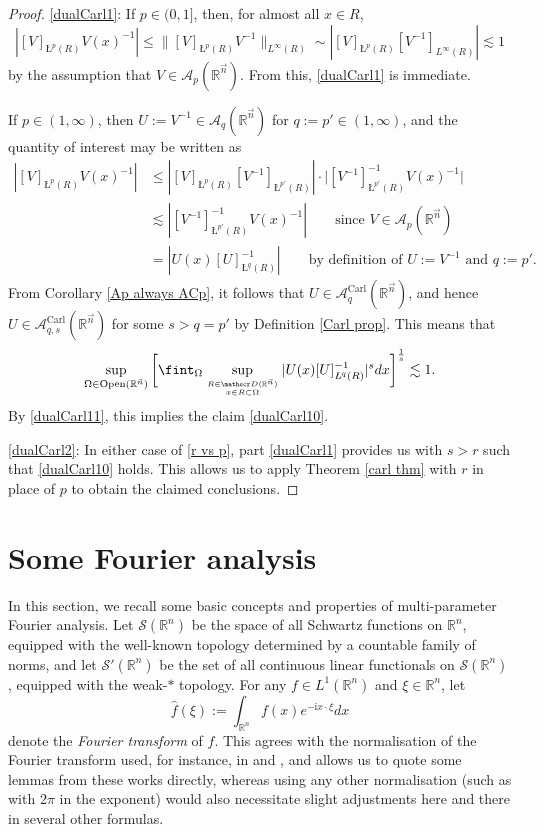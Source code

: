 \documentclass[11pt, reqno]{amsart}
\theoremstyle{definition}
\theoremstyle{remark}
\numberwithin{equation}{section}
\newcommand{\A}{\mathscr A}
\newcommand{\D}{\mathscr D}
\newcommand{\R}{\mathbb R}
\newcommand{\Sc}{\mathscr S}
\newcommand{\vn}{\vec n}
\newcommand{\aveL}{\textit{\L}}
\newcommand{\abs}[1]{|#1|}
\newcommand{\Babs}[1]{\Big|#1\Big|}
\newcommand{\Norm}[2]{\|#1\|_{#2}}
\newcommand{\Carl}{\mathrm{Carl}}
\newcommand{\Open}{\mathrm{Open}}
\newcommand{\AC}{\A^{\Carl}}
\begin{document}
\begin{proof}
\eqref{dualCarl1}:
If $p\in(0,1]$, then, for almost all $x\in R$,
\begin{equation*}
\abs{[V]_{\aveL^p(R)}V(x)^{-1}}
\leq \Norm{[V]_{\aveL^p(R)}V^{-1}}{L^\infty(R)}
\sim \abs{[V]_{\aveL^p(R)}[V^{-1}]_{L^\infty(R)}}\lesssim 1
\end{equation*}
by the assumption that $V\in\A_p(\R^{\vec n})$. From this, \eqref{dualCarl1} is immediate.

If $p\in(1,\infty)$, then $U:=V^{-1}\in\A_q(\R^{\vec n})$ for $q:=p'\in(1,\infty)$, and the quantity of interest may be written as
\begin{equation}\label{dualCarl11}
\begin{split}
\abs{[V]_{\aveL^p(R)}V(x)^{-1}}
 &\leq\abs{[V]_{\aveL^p(R)}[V^{-1}]_{\aveL^{p'}(R)}}\cdot
 \Babs{[V^{-1}]_{\aveL^{p'}(R)}^{-1}V(x)^{-1}} \\
 &\lesssim\abs{[V^{-1}]_{\aveL^{p'}(R)}^{-1}V(x)^{-1}}\qquad\text{since }V\in\A_p(\R^{\vn}) \\
 &=\abs{U(x)[U]_{\aveL^q(R)}^{-1}}\qquad\text{by definition of $U:=V^{-1}$ and $q:=p'$}.
\end{split}
\end{equation}
From Corollary \ref{Ap always ACp}, it follows that $U\in\AC_q(\R^{\vn})$, and hence $U\in\AC_{q,s}(\R^{\vn})$ for some $s>q=p'$ by Definition \ref{Carl prop}. This means that
\begin{equation*}
\sup_{\Omega\in\Open(\R^{\vn})}
\bigg[\fint_\Omega \sup_{\genfrac{}{}{0pt}{}{R\in\D(\R^{\vn})}{x\in R\subset\Omega}}
\abs{U(x)[U]_{\aveL^{q}(R)}^{-1} }^s dx \bigg]^{\frac1s}
\lesssim 1.
\end{equation*}
By \eqref{dualCarl11}, this implies the claim \eqref{dualCarl10}.

\eqref{dualCarl2}: In either case of \eqref{r vs p}, part \eqref{dualCarl1} provides us with $s>r$ such that \eqref{dualCarl10} holds. This allows us to apply Theorem \ref{carl thm} with $r$ in place of $p$ to obtain the claimed conclusions.
\end{proof}

\section{Some Fourier analysis} \label{sec:fourier}

In this section, we recall some basic concepts and properties of multi-parameter Fourier analysis.
Let $\Sc(\R^n)$ be the space of all Schwartz functions on $\R^n$,
equipped with the well-known topology determined by a countable family of norms,
and let $\Sc'(\R^n)$ be the set of all continuous linear functionals on $\Sc(\R^n)$,
equipped with the weak-$*$ topology.
For any $f\in L^1(\R^n)$ and $\xi\in\R^{n}$, let
$$
\widehat{f}(\xi):=\int_{\mathbb{R}^n}f(x)e^{-\mathrm i x\cdot\xi}dx
$$
denote the \emph{Fourier transform} of $f$.
This agrees with the normalisation of the Fourier transform used,
for instance, in \cite[p.\,4]{FJW91} and \cite[p.\,452]{YY10},
and allows us to quote some lemmas from these works directly,
whereas using any other normalisation (such as with $2\pi$ in the exponent)
would also necessitate slight adjustments here and there in several other formulas.
\end{document}
